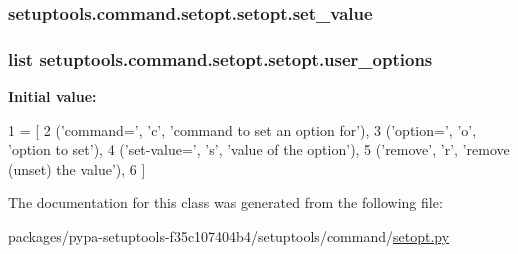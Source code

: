 \subsubsection[{set\+\_\+value}]{\setlength{\rightskip}{0pt plus 5cm}setuptools.\+command.\+setopt.\+setopt.\+set\+\_\+value}\label{classsetuptools_1_1command_1_1setopt_1_1setopt_ae7d35dee0885a7f5eeefd36772e47ed5}
\hypertarget{classsetuptools_1_1command_1_1setopt_1_1setopt_a168f29ae29a87d87edb9cc73ebd867ac}{}
\subsubsection[{user\+\_\+options}]{\setlength{\rightskip}{0pt plus 5cm}list setuptools.\+command.\+setopt.\+setopt.\+user\+\_\+options\hspace{0.3cm}{\ttfamily [static]}}\label{classsetuptools_1_1command_1_1setopt_1_1setopt_a168f29ae29a87d87edb9cc73ebd867ac}
{\bfseries Initial value\+:}
\begin{DoxyCode}
1 = [
2         (\textcolor{stringliteral}{'command='}, \textcolor{stringliteral}{'c'}, \textcolor{stringliteral}{'command to set an option for'}),
3         (\textcolor{stringliteral}{'option='}, \textcolor{stringliteral}{'o'}, \textcolor{stringliteral}{'option to set'}),
4         (\textcolor{stringliteral}{'set-value='}, \textcolor{stringliteral}{'s'}, \textcolor{stringliteral}{'value of the option'}),
5         (\textcolor{stringliteral}{'remove'}, \textcolor{stringliteral}{'}\textcolor{stringliteral}{r', '}remove (unset) the value'),
6     ]
\end{DoxyCode}


The documentation for this class was generated from the following file\+:\begin{DoxyCompactItemize}
\item 
packages/pypa-\/setuptools-\/f35c107404b4/setuptools/command/\hyperlink{setopt_8py}{setopt.\+py}\end{DoxyCompactItemize}
